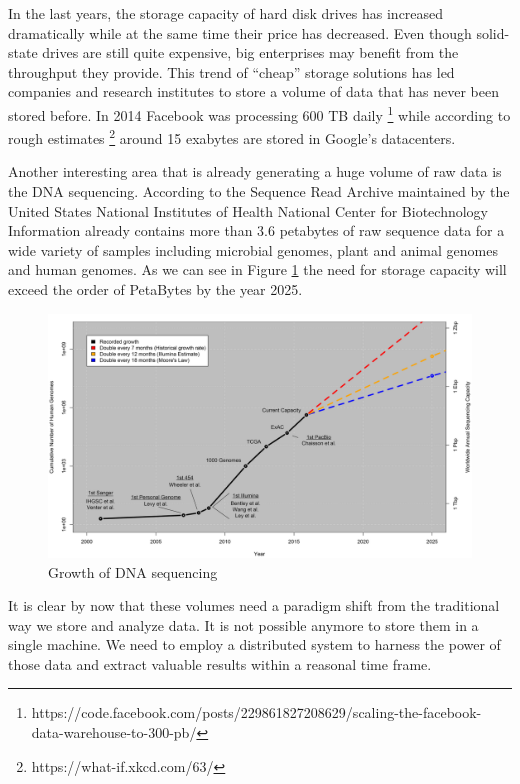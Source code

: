 In the last years, the storage capacity of hard disk drives has
increased dramatically while at the same time their price has
decreased. Even though solid-state drives are still quite expensive,
big enterprises may benefit from the throughput they provide. This
trend of ``cheap'' storage solutions has led companies and research
institutes to store a volume of data that has never been stored
before. In 2014 Facebook was processing 600 TB daily
\footnote{https://code.facebook.com/posts/229861827208629/scaling-the-facebook-data-warehouse-to-300-pb/}
while according to rough estimates
\footnote{https://what-if.xkcd.com/63/} around 15 exabytes are stored
in Google's datacenters.

Another interesting area that is already generating a huge volume of
raw data is the DNA sequencing. According to \cite{10.1371/journal.pbio.1002195} the Sequence
Read Archive maintained by the United States National Institutes of Health
National Center for Biotechnology Information already contains more
than 3.6 petabytes of raw sequence data for a wide variety of samples
including microbial genomes, plant and animal genomes and human
genomes. As we can see in Figure \ref{fig:intro_genomics_growth} the
need for storage capacity will exceed the order of PetaBytes by the
year 2025.

\begin{figure}
\centering
\includegraphics[scale=0.5]{resources/images/Introduction/genomics_growth.png}
\caption{Growth of DNA sequencing \cite{10.1371/journal.pbio.1002195}}
\label{fig:intro_genomics_growth}
\end{figure}

It is clear by now that these volumes need a paradigm shift
from the traditional way we store and analyze data. It is not possible
anymore to store them in a single machine. We need to employ a
distributed system to harness the power of those data and extract
valuable results within a reasonal time frame.